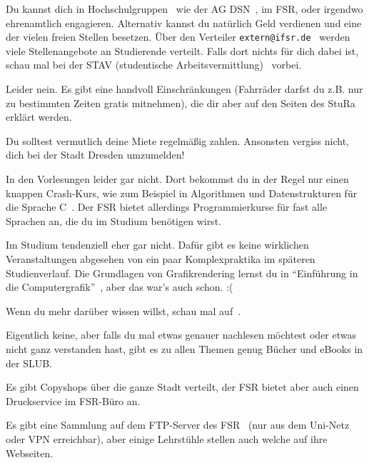 Du kannst dich in Hochschulgruppen~ wie der AG DSN~, im FSR, oder irgendwo ehrenamtlich engagieren. Alternativ kannst du natürlich Geld verdienen und eine der vielen freien Stellen besetzen. Über den Verteiler \texttt{extern@ifsr.de}~ werden viele Stellenangebote an Studierende verteilt. Falls dort nichts für dich dabei ist, schau mal bei der STAV (studentische Arbeitsvermittlung)~ vorbei.

Leider nein. Es gibt eine handvoll Einschränkungen (Fahrräder darfst du z.B. nur zu bestimmten Zeiten gratis mitnehmen), die dir aber auf den Seiten des StuRa~ erklärt werden.

Du solltest vermutlich deine Miete regelmäßig zahlen. Ansonsten vergiss nicht, dich bei der Stadt Dresden umzumelden! 

In den Vorlesungen leider gar nicht. Dort bekommst du in der Regel nur einen knappen Crash-Kurs, wie zum Beispiel in Algorithmen und Datenstrukturen für die Sprache C~.
Der FSR bietet allerdings Programmierkurse für fast alle Sprachen an, die du im Studium benötigen wirst. 

Im Studium tendenziell eher gar nicht. Dafür gibt es keine wirklichen Veranstaltungen abgesehen von ein paar Komplexpraktika im späteren Studienverlauf. Die Grundlagen von Grafikrendering lernst du in \enquote{Einführung in die Computergrafik}~, aber das war's auch schon. :(

\label{minisec:faq}
Wenn du mehr darüber wissen willst, schau mal auf~.

Eigentlich keine, aber falls du mal etwas genauer nachlesen möchtest oder etwas nicht ganz verstanden hast, gibt es zu allen Themen genug Bücher und eBooks in der SLUB.~

Es gibt Copyshops über die ganze Stadt verteilt, der FSR bietet aber auch einen Druckservice im FSR-Büro an.

Es gibt eine Sammlung auf dem FTP-Server des FSR~ (nur aus dem Uni-Netz oder VPN erreichbar), aber einige Lehrstühle stellen auch welche auf ihre Webseiten.
